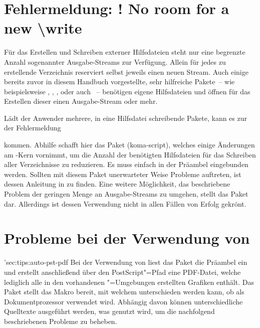 \section{Fehlermeldung: ! No room for a new \textbackslash write}
%
%
Für das Erstellen und Schreiben externer Hilfsdateien steht  nur 
eine begrenzte Anzahl sogenannter Ausgabe-Streams zur Verfügung. Allein für 
jedes zu erstellende Verzeichnis reserviert  selbst jeweils einen 
neuen Stream. Auch einige bereits zuvor in diesem Handbuch vorgestellte, sehr 
hilfreiche Pakete~-- wie beispielsweise , , 
,  oder auch ~-- 
benötigen eigene Hilfsdateien und öffnen für das Erstellen dieser einen 
Ausgabe-Stream oder mehr.

Lädt der Anwender mehrere, in eine Hilfsdatei schreibende Pakete, kann es zur 
der Fehlermeldung
%
\begin{quoting}
\end{quoting}
%
kommen. Abhilfe schafft hier das Paket (koma-script), welches 
einige Änderungen am -Kern vornimmt, um die Anzahl der benötigten 
Hilfsdateien für das Schreiben aller Verzeichnisse zu reduzieren. Es muss 
einfach in der Präambel eingebunden werden. Sollten mit diesem Paket 
unerwarteter Weise Probleme auftreten, ist dessen Anleitung in \scrguide zu 
finden. Eine weitere Möglichkeit, das beschriebene Problem der geringen Menge 
an Ausgabe-Streams zu umgehen, stellt das Paket  dar. 
Allerdings ist dessen Verwendung nicht in allen Fällen von Erfolg gekrönt.



\section{Probleme bei der Verwendung von }
\manualhyperdef'{sec:tips:auto-pst-pdf}
%
%
Bei der Verwendung von  liest das Paket  
die Präambel ein und erstellt anschließend über den PostScript"=Pfad 
 eine PDF-Datei, 
welche lediglich alle in den vorhandenen "=Umgebungen 
erstellten Grafiken enthält. 
Das Paket  
stellt das Makro  bereit, mit welchem unterschieden werden kann, 
ob  als Dokumentprozessor verwendet wird. Abhängig davon 
können unterschiedliche Quelltexte ausgeführt werden, was genutzt wird, um die 
nachfolgend beschriebenen Probleme zu beheben.
%
\begin{quoting}
\begin{Code}
\usepackage{ifpdf}
\end{Code}
\end{quoting}

